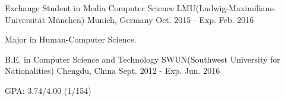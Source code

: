 \begin{cventries}
  \cventry
    {Exchange Student in Media Computer Science}
    {LMU(Ludwig-Maximilians-Universität München)}
    {Munich, Germany}
    {Oct. 2015 - Exp. Feb. 2016}
    {
      \begin{cvitems}
        \item {Major in Human-Computer Science.}
      \end{cvitems}
    }
\end{cventries}

\begin{cventries}
  \cventry
    {B.E. in Computer Science and Technology}
    {SWUN(Southwest University for Nationalities)}
    {Chengdu, China}
    {Sept. 2012 - Exp. Jun. 2016}
    {
      \begin{cvitems}
        \item {GPA: 3.74/4.00 (1/154)}
      \end{cvitems}
    }
\end{cventries}


